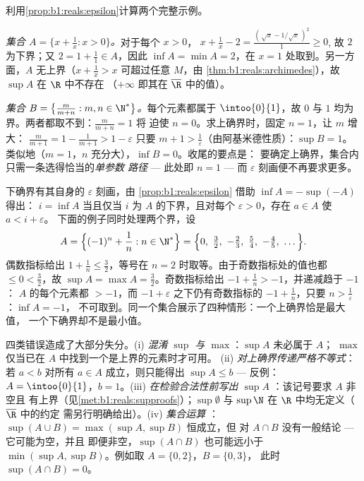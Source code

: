 \begin{example}[实际计算上确界]\label{ex:b1:reals:supcompute}
利用\cref{prop:b1:reals:epsilon}计算两个完整示例。

\emph{集合 $A = \{x + \frac1x : x > 0\}$。}对于每个 $x > 0$，
$x + \frac1x - 2 = \frac{(\,\sqrt x - 1/\sqrt x\,)^2}{1} \geq 0$,
故 $2$ 为下界；又 $2 = 1 + \frac11 \in A$，因此
$\inf A = \min A = 2$，在 $x = 1$ 处取到。另一方面，$A$
无上界（$x + \frac1x > x$ 可超过任意 $M$，由
\cref{thm:b1:reals:archimedes}），故 $\sup A$ 在 $\R$ 中不存在
（$+\infty$ 即其在 $\overline\R$ 中的值）。

\emph{集合 $B = \bigl\{\frac{m}{m + n} : m, n \in
\N^*\bigr\}$。}每个元素都属于 $\intoo{0}{1}$，故 $0$ 与
$1$ 均为界。两者都取不到：$\frac{m}{m+n} = 1$ 将
迫使 $n = 0$。求上确界时，固定 $n = 1$，让 $m$ 增大：
$\frac{m}{m+1} = 1 - \frac{1}{m+1} > 1 - \varepsilon$ 只要
$m + 1 > \frac1\varepsilon$（由阿基米德性质）：$\sup B = 1$。
类似地（$m = 1$，$n$ 充分大），$\inf B = 0$。收尾的要点是：
要确定上确界，集合内只需一条选得恰当的\emph{单参数
路径} --- 此处即 $n = 1$ --- 而
$\varepsilon$ 刻画便不再要求更多。
\end{example}

\begin{example}[下确界的对偶]\label{ex:b1:reals:infmirror}
下确界有其自身的 $\varepsilon$ 刻画，由
\cref{prop:b1:reals:epsilon} 借助 $\inf A = -\sup(-A)$ 得出：
$i = \inf A$ 当且仅当 $i$ 为 $A$ 的下界，且对每个
$\varepsilon > 0$，存在 $a \in A$ 使 $a < i + \varepsilon$。
下面的例子同时处理两个界，设
\[
A = \Bigl\{(-1)^n + \frac1n : n \in \N^*\Bigr\}
= \Bigl\{0,\ \tfrac32,\ -\tfrac23,\ \tfrac54,\ -\tfrac45,\
\dots\Bigr\} .
\]
偶数指标给出 $1 + \frac1n \leq \frac32$，等号在
$n = 2$ 时取等。由于奇数指标处的值也都 $\leq 0 <
\frac32$，故 $\sup A = \max A = \frac32$。奇数指标给出
$-1 + \frac1n > -1$，并递减趋于 $-1$：
$A$ 的每个元素都 $> -1$，而 $-1 + \varepsilon$ 之下仍有奇数指标的 $-1 +
\frac1n$，只要 $n > \frac1\varepsilon$：$\inf A = -1$，
不可取到。同一个集合展示了四种情形：一个上确界恰是最大值，
一个下确界却不是最小值。
\end{example}

\begin{remark}[上、下确界的常见错误]
四类错误造成了大部分失分。(i) \emph{混淆
$\sup$ 与 $\max$}：$\sup A$ 未必属于 $A$；
$\max$ 仅当已在 $A$ 中找到一个是上界的元素时才可用。
(ii) \emph{对上确界传递严格不等式}：若 $a <
b$ 对所有 $a \in A$ 成立，则只能得出 $\sup A \leq b$ ---
反例：$A = \intoo{0}{1}$，$b = 1$。(iii) \emph{在检验合法性前写出 $\sup A$
}：该记号要求 $A$ 非空且
有上界（见\cref{met:b1:reals:supproofs}）；$\sup \emptyset$
与 $\sup \N$ 在 $\R$ 中均无定义（$\overline\R$ 中的约定
需另行明确给出）。(iv) \emph{集合运算
}：$\sup(A \cup B) = \max(\sup A, \sup B)$ 恒成立，但
对 $A \cap B$ 没有一般结论 --- 它可能为空，并且
即便非空，$\sup(A \cap B)$ 也可能远小于
$\min(\sup A, \sup B)$。例如取 $A = \{0, 2\}$，$B = \{0, 3\}$，
此时 $\sup(A \cap B) = 0$。
\end{remark}

